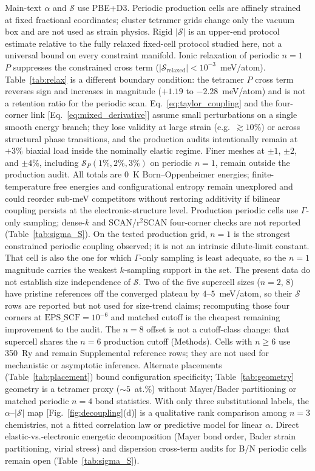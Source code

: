 \documentclass[%
 reprint,
 groupedaddress,
 amsmath,amssymb,
 aps,
 prb,
 floatfix,
]{revtex4-2}
\begin{document}
Main-text $\alpha$ and $\mathcal{S}$ use PBE+D3. Periodic production cells are affinely strained at fixed fractional coordinates; cluster tetramer grids change only the vacuum box and are not used as strain physics. Rigid $|\mathcal{S}|$ is an upper-end protocol estimate relative to the fully relaxed fixed-cell protocol studied here, not a universal bound on every constraint manifold. Ionic relaxation of periodic $n{=}1$ $P$ suppresses the constrained cross term ($|\mathcal{S}_{\mathrm{relaxed}}|<10^{-3}$~meV/atom). Table~\ref{tab:relax} is a different boundary condition: the tetramer $P$ cross term reverses sign and increases in magnitude ($+1.19$ to $-2.28$~meV/atom) and is not a retention ratio for the periodic scan.
Eq.~\eqref{eq:taylor_coupling} and the four-corner link [Eq.~\eqref{eq:mixed_derivative}] assume small perturbations on a single smooth energy branch; they lose validity at large strain (e.g.\ ${\gtrsim}10$\%) or across structural phase transitions, and the production audits intentionally remain at $+3$\% biaxial load inside the nominally elastic regime. Finer meshes at $\pm 1$, $\pm 2$, and $\pm 4$\%, including $\mathcal{S}_{P}(1\%,2\%,3\%)$ on periodic $n{=}1$, remain outside the production audit.
All totals are 0~K Born--Oppenheimer energies; finite-temperature free energies and configurational entropy remain unexplored and could reorder sub-meV competitors without restoring additivity if bilinear coupling persists at the electronic-structure level.
Production periodic cells use $\Gamma$-only sampling; dense-$k$ and SCAN/r$^2$SCAN four-corner checks are not reported (Table~\ref{tab:sigma_S}).
On the tested production grid, $n{=}1$ is the strongest constrained periodic coupling observed; it is not an intrinsic dilute-limit constant. That cell is also the one for which $\Gamma$-only sampling is least adequate, so the $n{=}1$ magnitude carries the weakest $k$-sampling support in the set. The present data do not establish size independence of $\mathcal{S}$.
Two of the five supercell sizes ($n{=}2$, $8$) have pristine references off the converged plateau by $4$--$5$~meV/atom, so their $\mathcal{S}$ rows are reported but not used for size-trend claims; recomputing those four corners at $\mathrm{EPS\_SCF}=10^{-6}$ and matched cutoff is the cheapest remaining improvement to the audit.
The $n{=}8$ offset is not a cutoff-class change: that supercell shares the $n{=}6$ production cutoff (Methods). Cells with $n{\geq}6$ use 350~Ry and remain Supplemental reference rows; they are not used for mechanistic or asymptotic inference.
Alternate placements (Table~\ref{tab:placement}) bound configuration specificity; Table~\ref{tab:geometry} geometry is a tetramer proxy (${\sim}5$~at.\%) without Mayer/Bader partitioning or matched periodic $n{=}4$ bond statistics.
With only three substitutional labels, the $\alpha$--$|\mathcal{S}|$ map [Fig.~\ref{fig:decoupling}(d)] is a qualitative rank comparison among $n{=}3$ chemistries, not a fitted correlation law or predictive model for linear $\alpha$.
Direct elastic-vs.-electronic energetic decomposition (Mayer bond order, Bader strain partitioning, virial stress) and dispersion cross-term audits for B/N periodic cells remain open (Table~\ref{tab:sigma_S}).
\end{document}
